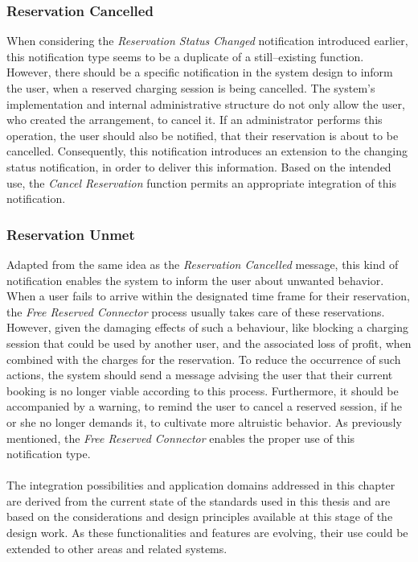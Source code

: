 \subsubsection{Reservation Cancelled}
\label{ch:Design:sec:Reservation System:ssec:Notification Capabilities:sssec:Reservation Cancelled}

When considering the \textit{Reservation Status Changed} notification introduced earlier, this notification type seems to be a duplicate of a still--existing function.
However, there should be a specific notification in the system design to inform the user, when a reserved charging session is being cancelled. The system's implementation and internal administrative structure do not only allow the user, who created the arrangement, to cancel it.
If an administrator performs this operation, the user should also be notified, that their reservation is about to be cancelled.
Consequently, this notification introduces an extension to the changing status notification, in order to deliver this information.
Based on the intended use, the \textit{Cancel Reservation} function permits an appropriate integration of this notification.

\subsubsection{Reservation Unmet}
\label{ch:Design:sec:Reservation System:ssec:Notification Capabilities:sssec:Reservation Unmet}

Adapted from the same idea as the \textit{Reservation Cancelled} message, this kind of notification enables the system to inform the user about unwanted behavior.
When a user fails to arrive within the designated time frame for their reservation, the \textit{Free Reserved Connector} process usually takes care of these reservations.
However, given the damaging effects of such a behaviour, like blocking a charging session that could be used by another user, and the associated loss of profit, when combined with the charges for the reservation.
To reduce the occurrence of such actions, the system should send a message advising the user that their current booking is no longer viable according to this process. Furthermore, it should be accompanied by a warning, to remind the user to cancel a reserved session, if he or she no longer demands it, to cultivate more altruistic behavior.
As previously mentioned, the \textit{Free Reserved Connector} enables the proper use of this notification type. \\ \\
\noindent The integration possibilities and application domains addressed in this chapter are derived from the current state of the standards used in this thesis and are based on the considerations and design principles available at this stage of the design work.
As these functionalities and features are evolving, their use could be extended to other areas and related systems.
